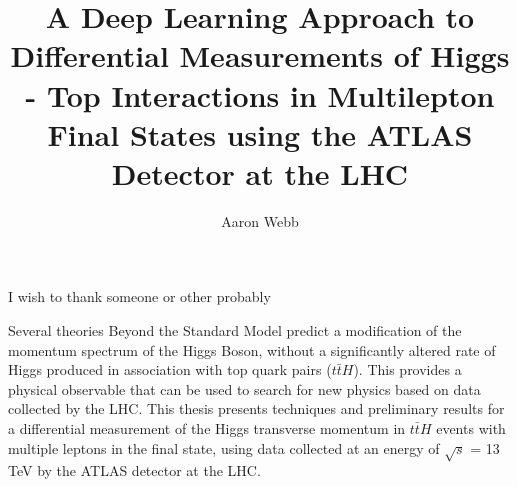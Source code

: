 \documentclass[12pt]{report}	%
\author{Aaron Webb}  	%
\title{A Deep Learning Approach to Differential Measurements of Higgs - Top Interactions in Multilepton Final States using the ATLAS Detector at the LHC}
\theoremstyle{definition}
\theoremstyle{remark}
\begin{document}
\copyrightpage          %


%
%
%
\commcertpage           %

\titlepage              %


%


\begin{acknowledgments}		%
%
I wish to thank someone or other probably
\end{acknowledgments}


%
\utabstract
{}%
\indent

\par Several theories Beyond the Standard Model predict a modification of the momentum spectrum of the Higgs Boson, without a significantly altered rate of Higgs produced in association with top quark pairs ($t\bar{t}H$). This provides a physical observable that can be used to search for new physics based on data collected by the LHC. This thesis presents techniques and preliminary results for a differential measurement of the Higgs transverse momentum in $t\bar{t}H$ events with multiple leptons in the final state, using data collected at an energy of $\sqrt{s}$ = 13 TeV by the ATLAS detector at the LHC.
\end{document}
